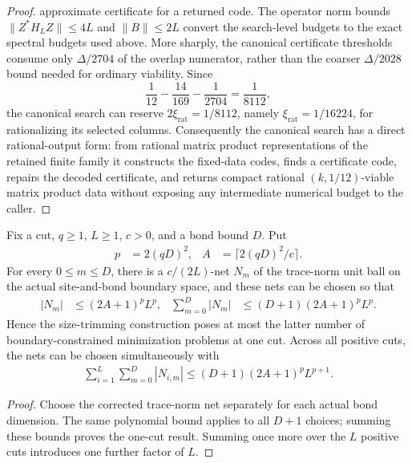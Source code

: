 \begin{proof}
    approximate certificate for a returned code.  The operator norm bounds
    \(\lVert Z^*H_LZ\rVert\le4L\) and \(\lVert B\rVert\le2L\) convert the
    search-level budgets to the exact spectral budgets used above.
    More sharply, the canonical certificate thresholds consume only
    \(\Delta/2704\) of the overlap numerator, rather than the coarser
    \(\Delta/2028\) bound needed for ordinary viability.  Since
    \[
        \frac1{12}-\frac{14}{169}-\frac1{2704}=\frac1{8112},
    \]
    the canonical search can reserve \(2\xi_{\mathrm{rat}}=1/8112\), namely
    \(\xi_{\mathrm{rat}}=1/16224\), for rationalizing its selected columns.
    Consequently the canonical search has a direct rational-output form:
    from rational matrix product representations of the retained finite
    family it constructs the fixed-data codes, finds a certificate code,
    repairs the decoded certificate, and returns compact rational
    \((k,1/12)\)-viable matrix product data without exposing any intermediate
    numerical budget to the caller.
\end{proof}

\begin{lemma}
    \label{thm:lvv_boundary_program_count}
    \leanok
    Fix a cut, $q\ge1$, $L\ge1$, $c>0$, and a bond bound $D$.  Put
    \begin{align*}
        p & =2(qD)^2, & A & =\lceil2(qD)^2/c\rceil.
    \end{align*}
    For every $0\le m\le D$, there is a $c/(2L)$-net $N_m$ of the
    trace-norm unit ball on the actual site-and-bond boundary space, and
    these nets can be chosen so that
    \begin{align*}
        |N_m| & \le(2A+1)^pL^p,
              & \sum_{m=0}^{D}|N_m| & \le(D+1)(2A+1)^pL^p.
    \end{align*}
    Hence the size-trimming construction poses at most the latter number
    of boundary-constrained minimization problems at one cut.  Across all
    positive cuts, the nets can be chosen simultaneously with
    \begin{align*}
        \sum_{i=1}^{L}\sum_{m=0}^{D}|N_{i,m}|
        \le(D+1)(2A+1)^pL^{p+1}.
    \end{align*}
\end{lemma}
\begin{proof}
    \leanok
    Choose the corrected trace-norm net separately for each actual bond
    dimension.  The same polynomial bound applies to all $D+1$ choices;
    summing these bounds proves the one-cut result.  Summing once more over
    the $L$ positive cuts introduces one further factor of $L$.
\end{proof}

